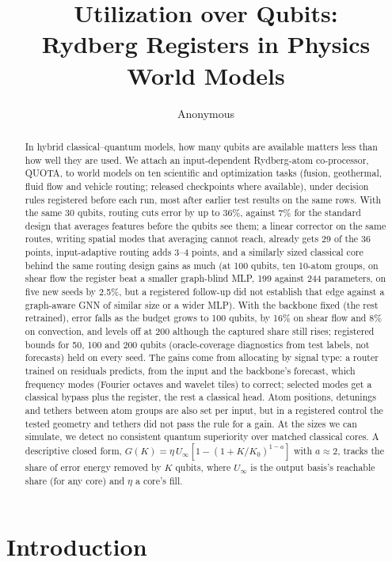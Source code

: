 \documentclass{article}
\title{Utilization over Qubits:\\Rydberg Registers in Physics World Models}
\author{Anonymous}
\begin{document}
\maketitle

\begin{abstract}
In hybrid classical--quantum models, how many qubits are available matters less than how well they are used. We attach
an input-dependent Rydberg-atom co-processor, QUOTA, to world models on ten scientific and optimization tasks (fusion,
geothermal, fluid flow and vehicle routing; released checkpoints where available), under decision rules registered before each run, most after earlier test results on the same rows. With the same 30
qubits, routing cuts error by up to 36\%, against 7\% for the standard design that averages features before the qubits
see them; a linear corrector on the same routes, writing spatial modes that averaging cannot reach, already gets 29 of
the 36 points, input-adaptive routing adds 3--4 points, and a similarly sized classical core behind the same routing design gains as much (at 100 qubits, ten 10-atom
groups, on shear flow the register beat a smaller graph-blind MLP, 199 against 244 parameters, on five new seeds by
2.5\%, but a registered follow-up did not establish that edge against a graph-aware GNN of similar size or a wider MLP). With the backbone fixed (the rest retrained),
error falls as the budget grows to 100 qubits, by 16\% on shear flow and 8\% on convection, and levels off at 200 although
the captured share still rises; registered bounds for 50, 100 and 200 qubits (oracle-coverage diagnostics from test
labels, not forecasts) held on every seed. The gains come from allocating by signal type: a router trained on residuals
predicts, from the input and the backbone's forecast, which frequency modes (Fourier octaves and wavelet tiles) to
correct; selected modes get a classical bypass plus the register, the rest a classical head. Atom positions, detunings and tethers between atom groups are also set per input, but in a registered control
the tested geometry and tethers did not pass the rule for a gain. At the sizes we can simulate, we detect no consistent quantum
superiority over matched classical cores. A descriptive closed form, $G(K)=\eta\,U_\infty[1-(1+K/K_0)^{1-a}]$ with
$a\approx2$, tracks the share of error energy removed by $K$ qubits, where $U_\infty$ is the output basis's reachable share (for
any core) and $\eta$ a core's fill.
\end{abstract}

\section{Introduction}
\label{sec:intro}
\end{document}
